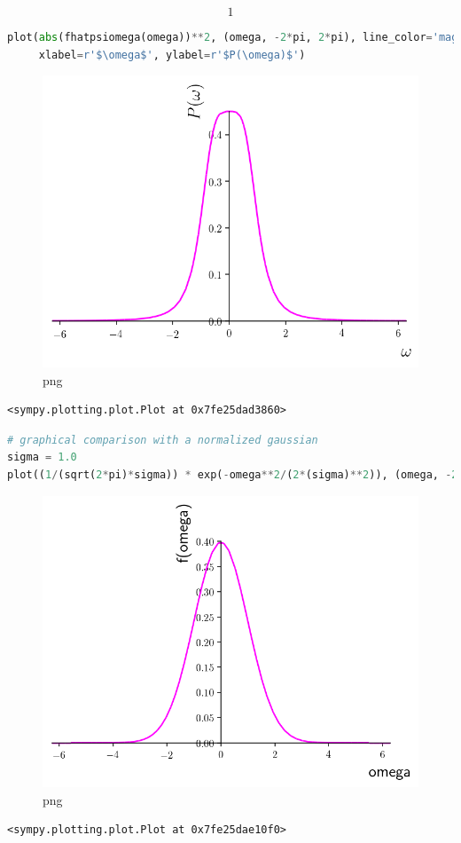 \[1\]

\begin{lstlisting}[language=Python]
plot(abs(fhatpsiomega(omega))**2, (omega, -2*pi, 2*pi), line_color='magenta', 
     xlabel=r'$\omega$', ylabel=r'$P(\omega)$')
\end{lstlisting}

\begin{figure}
\centering
\includegraphics[width=0.6\linewidth]{output_64_0.png}
\caption[]{png}
\end{figure}

\begin{lstlisting}
<sympy.plotting.plot.Plot at 0x7fe25dad3860>
\end{lstlisting}

\begin{lstlisting}[language=Python]
# graphical comparison with a normalized gaussian
sigma = 1.0
plot((1/(sqrt(2*pi)*sigma)) * exp(-omega**2/(2*(sigma)**2)), (omega, -2*pi, 2*pi), line_color='magenta')
\end{lstlisting}

\begin{figure}
\centering
\includegraphics[width=0.6\linewidth]{output_65_0.png}
\caption[]{png}
\end{figure}

\begin{lstlisting}
<sympy.plotting.plot.Plot at 0x7fe25dae10f0>
\end{lstlisting}

